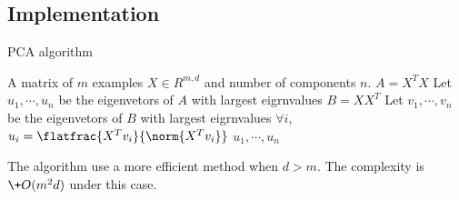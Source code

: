 \subsection{Implementation}
\begin{algorithm}[htbp]
	\caption{PCA algorithm}
	\label{alg:pca}
	\begin{algorithmic}[1]
		\renewcommand{\algorithmicrequire}{\textbf{Input:}}
		\renewcommand{\algorithmicensure}{\textbf{Output:}}
		\renewcommand{\algorithmiccomment}[1]{\hfill\textit{\textcolor{blue}{\##1}}}
		\REQUIRE A matrix of $m$ examples $X \in R^{m,d}$ and number of components $n$.
		\STATE $A=X^TX$
		\STATE Let $u_1,\cdots,u_n$ be the eigenvetors of $A$ with largest eigrnvalues
		\ELSE
		\STATE $B=XX^T$
		\STATE Let $v_1,\cdots,v_n$ be the  eigenvetors of $B$ with largest eigrnvalues
		\STATE $\forall i$, $u_i=\flatfrac{X^Tv_i}{\norm{X^Tv_i}}$
		\ENDIF
		\RETURN $u_1,\cdots,u_n$
	\end{algorithmic} 
\end{algorithm}
The algorithm use a more efficient method when $d>m$. The complexity is $\+O(m^2d)$ under this case.
